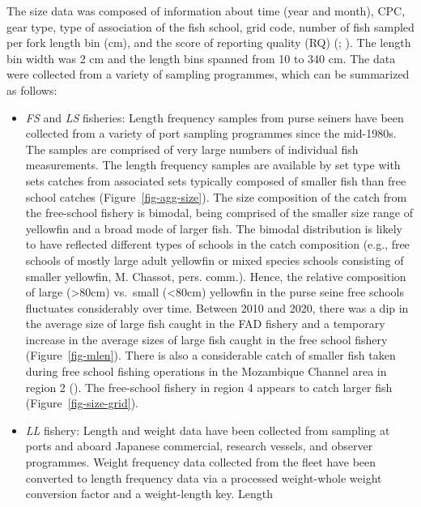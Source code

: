 \documentclass[
]{scrartcl}
\begin{document}
The size data was composed of information about time (year and month),
CPC, gear type, type of association of the fish school, grid code,
number of fish sampled per fork length bin (cm), and the score of
reporting quality (RQ)
(;
). The length bin
width was 2 cm and the length bins spanned from 10 to 340 cm. The data
were collected from a variety of sampling programmes, which can be
summarized as follows:

\begin{itemize}
\item
  \emph{FS} and \emph{LS} fisheries: Length frequency samples from purse
  seiners have been collected from a variety of port sampling programmes
  since the mid-1980s. The samples are comprised of very large numbers
  of individual fish measurements. The length frequency samples are
  available by set type with sets catches from associated sets typically
  composed of smaller fish than free school catches
  (Figure~\ref{fig-agg-size}). The size composition of the catch from
  the free-school fishery is bimodal, being comprised of the smaller
  size range of yellowfin and a broad mode of larger fish. The bimodal
  distribution is likely to have reflected different types of schools in
  the catch composition (e.g., free schools of mostly large adult
  yellowfin or mixed species schools consisting of smaller yellowfin, M.
  Chassot, pers. comm.). Hence, the relative composition of large
  (\textgreater80cm) vs.~small (\textless80cm) yellowfin in the purse
  seine free schools fluctuates considerably over time. Between 2010 and
  2020, there was a dip in the average size of large fish caught in the
  FAD fishery and a temporary increase in the average sizes of large
  fish caught in the free school fishery (Figure~\ref{fig-mlen}). There
  is also a considerable catch of smaller fish taken during free school
  fishing operations in the Mozambique Channel area in region 2
  (). The
  free-school fishery in region 4 appears to catch larger fish
  (Figure~\ref{fig-size-grid}).
\item
  \emph{LL} fishery: Length and weight data have been collected from
  sampling at ports and aboard Japanese commercial, research vessels,
  and observer programmes. Weight frequency data collected from the
  fleet have been converted to length frequency data via a processed
  weight-whole weight conversion factor and a weight-length key. Length

\end{itemize}
\end{document}
